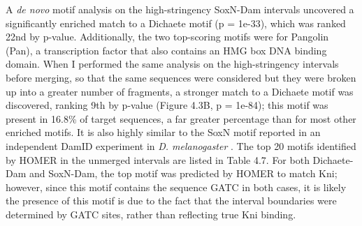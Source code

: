 A \emph{de novo} motif analysis on the high-stringency SoxN-Dam intervals uncovered a significantly enriched match to a Dichaete motif (p = 1e-33), which was ranked 22nd by p-value. Additionally, the two top-scoring motifs were for Pangolin (Pan), a transcription factor that also contains an HMG box DNA binding domain. When I performed the same analysis on the high-stringency intervals before merging, so that the same sequences were considered but they were broken up into a greater number of fragments, a stronger match to a Dichaete motif was discovered, ranking 9th by p-value (Figure 4.3B, p = 1e-84); this motif was present in 16.8\% of target sequences, a far greater percentage than for most other enriched motifs. It is also highly similar to the SoxN motif reported in an independent DamID experiment in \emph{D. melanogaster} \citep{ferrero_soxneuro_2014}. The top 20 motifs identified by HOMER in the unmerged intervals are listed in Table 4.7. For both Dichaete-Dam and SoxN-Dam, the top motif was predicted by HOMER to match Kni; however, since this motif contains the sequence GATC in both cases, it is likely the presence of this motif is due to the fact that the interval boundaries were determined by GATC sites, rather than reflecting true Kni binding.\\

